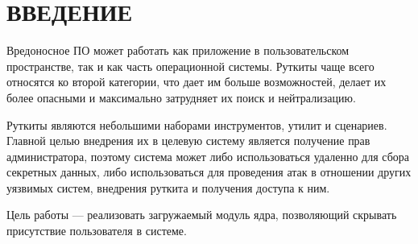 \chapter*{ВВЕДЕНИЕ}


Вредоносное ПО может работать как приложение в пользовательском пространстве, так и как часть операционной системы. Руткиты чаще всего относятся ко второй категории, что дает им больше возможностей, делает их более опасными и максимально затрудняет их поиск и нейтрализацию.

Руткиты являются небольшими наборами инструментов, утилит и сценариев. Главной целью внедрения их в целевую систему является получение прав администратора, поэтому система может либо использоваться удаленно для сбора секретных данных, либо использоваться для проведения атак в отношении других уязвимых систем, внедрения руткита и получения доступа к ним.

Цель работы --- реализовать загружаемый модуль ядра, позволяющий скрывать присутствие пользователя в системе.

